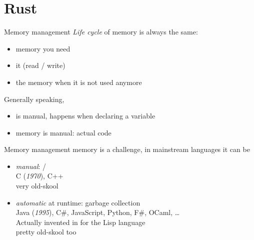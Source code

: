 \documentclass[10pt]{beamer}
\begin{document}
\section{Rust}



\begin{frame}{Memory management}
  \emph{Life cycle} of memory is always the same:
  \smallskip
  \begin{itemize}
    \item {} memory you need
    \item {} it (read / write)
    \item {} the memory when it is not used anymore
  \end{itemize}
  \medskip

  Generally speaking,
  \begin{itemize}
    \item {} is manual, happens when declaring a variable
    \item {} memory is manual: actual code
  \end{itemize}
\end{frame}



\begin{frame}{Memory management}
   memory is a challenge, in mainstream languages it can be
  \begin{itemize}
    \item \emph{manual}:  / \\
      \hfill C (\emph{1970}), C++\\
      very old-skool
    \item \emph{automatic} at runtime: garbage collection\\
      \hfill Java (\emph{1995}), C\#, JavaScript, Python, F\#, OCaml, \ldots\\
      \pause
      Actually invented in  for the Lisp language\\
      pretty old-skool too
  \end{itemize}
\end{frame}
\end{document}
